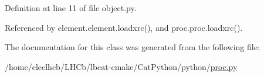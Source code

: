 Definition at line 11 of file object.\+py.



Referenced by element.\+element.\+loadxrc(), and proc.\+proc.\+loadxrc().



The documentation for this class was generated from the following file\+:\begin{DoxyCompactItemize}
\item 
/home/eleclhcb/\+L\+H\+Cb/lbcat-\/cmake/\+Cat\+Python/python/\hyperlink{proc_8py}{proc.\+py}\end{DoxyCompactItemize}
